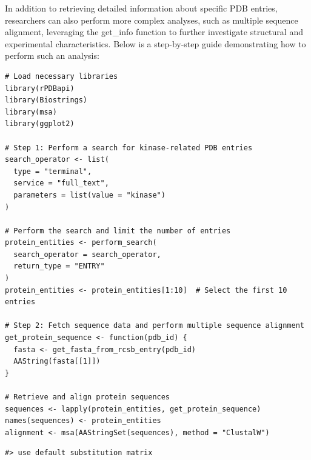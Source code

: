 In addition to retrieving detailed information about specific PDB entries, researchers can also perform more complex analyses, such as multiple sequence alignment, leveraging the get\_info function to further investigate structural and experimental characteristics. Below is a step-by-step guide demonstrating how to perform such an analysis:

\begin{verbatim}
# Load necessary libraries
library(rPDBapi)
library(Biostrings)
library(msa)
library(ggplot2)

# Step 1: Perform a search for kinase-related PDB entries
search_operator <- list(
  type = "terminal",
  service = "full_text",
  parameters = list(value = "kinase")
)

# Perform the search and limit the number of entries
protein_entities <- perform_search(
  search_operator = search_operator,
  return_type = "ENTRY"
)
protein_entities <- protein_entities[1:10]  # Select the first 10 entries

# Step 2: Fetch sequence data and perform multiple sequence alignment
get_protein_sequence <- function(pdb_id) {
  fasta <- get_fasta_from_rcsb_entry(pdb_id)
  AAString(fasta[[1]])
}

# Retrieve and align protein sequences
sequences <- lapply(protein_entities, get_protein_sequence)
names(sequences) <- protein_entities
alignment <- msa(AAStringSet(sequences), method = "ClustalW")
\end{verbatim}

\begin{verbatim}
#> use default substitution matrix
\end{verbatim}

